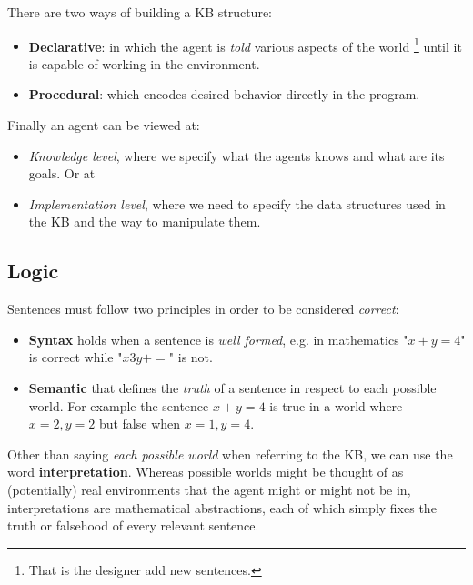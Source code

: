 \documentclass[10pt,a4paper]{article}
\begin{document}
There are two ways of building a KB structure:
\begin{itemize}
\item \textbf{Declarative}: in which the agent is \textit{told} various aspects of the world \footnote{That is the designer add new sentences.} until it is capable of working in the environment.
\item \textbf{Procedural}: which encodes desired behavior directly in the program.
\end{itemize}

Finally an agent can be viewed at:
\begin{itemize}
\item \textit{Knowledge level}, where we specify what the agents knows and what are its goals. Or at
\item \textit{Implementation level}, where we need to specify the data structures used in the KB and the way to manipulate them.
\end{itemize}

\subsection{Logic}
Sentences must follow two principles in order to be considered \textit{correct}:
\begin{itemize}
\item \textbf{Syntax} holds when a sentence is \textit{well formed}, e.g. in mathematics "$x+y=4$" is correct while "$x3y +=$" is not.
\item \textbf{Semantic}  that defines the \textit{truth} of a sentence in respect to each possible world. For example the sentence $x+y=4$ is true in a world where $x=2,y=2$ but false when $x=1,y=4$.
\end{itemize}

Other than saying \textit{each possible world} when referring to the KB, we can use the word \textbf{interpretation}. Whereas possible worlds might be thought of as (potentially) real environments that the agent might or might not be in, interpretations are mathematical abstractions, each of which simply fixes the truth or falsehood of every relevant sentence.\\
\end{document}
